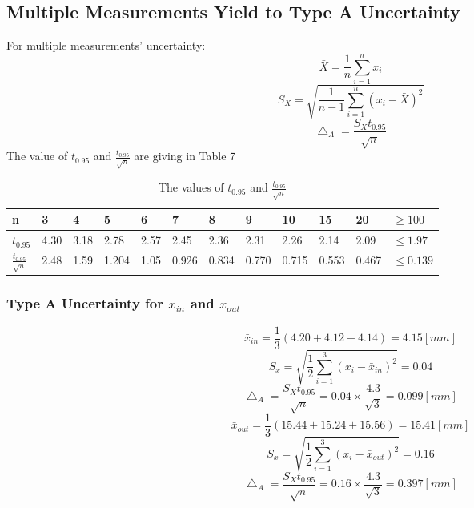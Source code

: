 \documentclass[12pt]{article}
\begin{document}
\subsection{Multiple Measurements Yield to Type A Uncertainty}
For multiple measurements' uncertainty:
$$\bar{X}=\frac{1}{n}\sum_{i=1}^nx_i$$
$$S_X=\sqrt{\frac{1}{n-1}\sum_{i=1}^n(x_i-\bar{X})^2}$$  
$$\bigtriangleup_A=\frac{S_Xt_{0.95}}{\sqrt{n}}$$
The value of $t_{0.95}$ and $\frac{t_{0.95}}{\sqrt{n}}$ are giving in Table 7 
\begin{table}[H]
\centering
\begin{tabular}{|l|l|l|l|l|l|l|l|l|l|l|l|}
\hline
n                         & 3    & 4    & 5     & 6    & 7     & 8     & 9     & 10    & 15    & 20    & $\ge100$   \\ \hline
$t_{0.95}$                  & 4.30 & 3.18 & 2.78  & 2.57 & 2.45  & 2.36  & 2.31  & 2.26  & 2.14  & 2.09  & $\le1.97$  \\ \hline
$\frac{t_0.95}{\sqrt{n}}$ & 2.48 & 1.59 & 1.204 & 1.05 & 0.926 & 0.834 & 0.770 & 0.715 & 0.553 & 0.467 & $\le0.139$ \\ \hline
\end{tabular}
\caption{The values of $t_{0.95}$ and $\frac{t_{0.95}}{\sqrt{n}}$}
\end{table}
\subsubsection{Type A Uncertainty for $x_{in}$ and $x_{out}$ }
$$\bar{x}_{in}=\frac{1}{3}(4.20+4.12+4.14)=4.15[mm]$$
$$S_x=\sqrt{\frac{1}{2}\sum_{i=1}^3(x_i-\bar{x}_{in})^2}=0.04$$
$$\bigtriangleup_A=\frac{S_Xt_{0.95}}{\sqrt{n}}=0.04\times\frac{4.3}{\sqrt{3}}=0.099[mm]$$
$$\bar{x}_{out}=\frac{1}{3}(15.44+15.24+15.56)=15.41[mm]$$
$$S_x=\sqrt{\frac{1}{2}\sum_{i=1}^3(x_i-\bar{x}_{out})^2}=0.16$$
$$\bigtriangleup_A=\frac{S_Xt_{0.95}}{\sqrt{n}}=0.16\times\frac{4.3}{\sqrt{3}}=0.397[mm]$$
\end{document}
